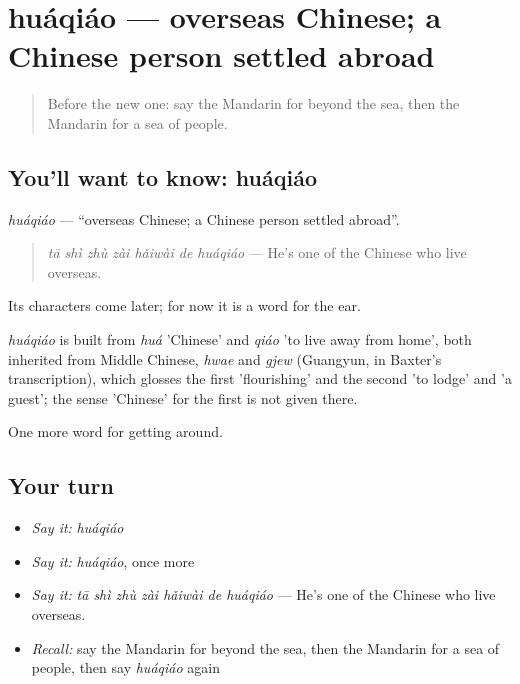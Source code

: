 \section[huáqiáo]{huáqiáo — overseas Chinese; a Chinese person settled abroad}

\label{lesson:ZH-C433-huaqiao}



\begin{quote}
Before the new one: say the Mandarin for beyond the sea, then the Mandarin for a sea of people.
\end{quote}

\subsection*{You'll want to know: huáqiáo}
\emph{huáqiáo} — \textquotedblleft{}overseas Chinese; a Chinese person settled abroad\textquotedblright{}.

\begin{quote}
\emph{tā shì zhù zài hǎiwài de huáqiáo} — He's one of the Chinese who live overseas.
\end{quote}

Its characters come later; for now it is a word for the ear.

\begin{cousinweb}
\emph{huáqiáo} is built from \emph{huá} 'Chinese' and \emph{qiáo} 'to live away from home', both inherited from Middle Chinese, \emph{hwae} and \emph{gjew} (Guangyun, in Baxter's transcription), which glosses the first 'flourishing' and the second 'to lodge' and 'a guest'; the sense 'Chinese' for the first is not given there.
\end{cousinweb}

\begin{grammarlens}[title={What you've built}]
One more word for getting around.
\end{grammarlens}

\subsection*{Your turn}
\begin{itemize}
\raggedright
  \item \emph{Say it:} \emph{huáqiáo}
  \item \emph{Say it:} \emph{huáqiáo}, once more
  \item \emph{Say it:} \emph{tā shì zhù zài hǎiwài de huáqiáo} — He's one of the Chinese who live overseas.
  \item \emph{Recall:} say the Mandarin for beyond the sea, then the Mandarin for a sea of people, then say \emph{huáqiáo} again
\end{itemize}

